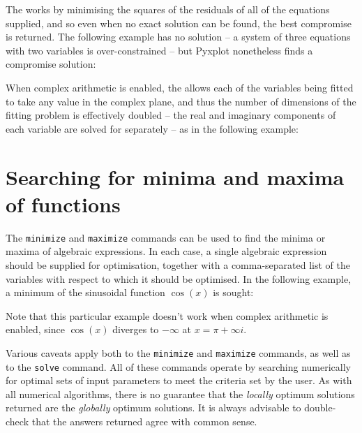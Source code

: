 The  works by minimising the squares of the residuals of all of the
equations supplied, and so even when no exact solution can be found, the best
compromise is returned. The following example has no solution -- a system of
three equations with two variables is over-constrained -- but Pyxplot
nonetheless finds a compromise solution:

\vspace{3mm}

\vspace{3mm}

When complex arithmetic is enabled, the  allows each of the
variables being fitted to take any value in the complex plane, and thus the
number of dimensions of the fitting problem is effectively doubled -- the real
and imaginary components of each variable are solved for separately -- as in
the following example:

\vspace{3mm}

\vspace{3mm}

\section{Searching for minima and maxima of functions}

The  {\tt minimize} and {\tt maximize}
commands can be used to find the minima or maxima of algebraic expressions. In
each case, a single algebraic expression should be supplied for optimisation,
together with a comma-separated list of the variables with respect to which it
should be optimised. In the following example, a minimum of the sinusoidal
function $\cos(x)$ is sought:

\vspace{3mm}

\vspace{3mm}

\noindent Note that this particular example doesn't work when complex
arithmetic is enabled, since $\cos(x)$ diverges to $-\infty$ at $x=\pi+\infty
i$.

Various caveats apply both to the {\tt minimize} and {\tt maximize} commands,
as well as to the {\tt solve} command.  All of these commands operate by
searching numerically for optimal sets of input parameters to meet the criteria
set by the user. As with all numerical algorithms, there is no guarantee that
the {\it locally} optimum solutions returned are the {\it globally} optimum
solutions. It is always advisable to double-check that the answers returned
agree with common sense.

